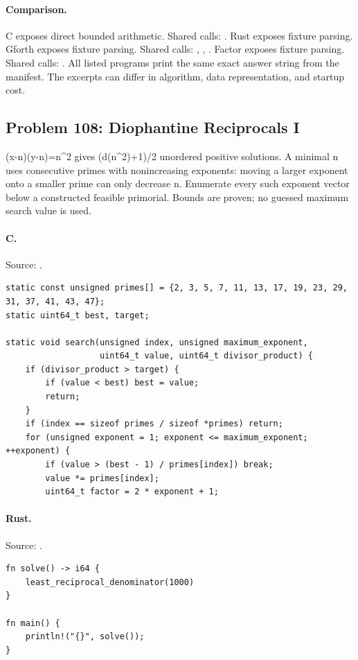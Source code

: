 \paragraph{Comparison.}
C exposes direct bounded arithmetic. Shared calls: \texttt{}. Rust exposes fixture parsing. Gforth exposes fixture parsing. Shared calls: \texttt{}, \texttt{}, \texttt{}. Factor exposes fixture parsing. Shared calls: \texttt{}.
All listed programs print the same exact answer string from the manifest. The excerpts can differ in algorithm, data representation, and startup cost.

\subsection{Problem 108: Diophantine Reciprocals I}
\label{walkthrough:p108}
(x-n)(y-n)=n\textasciicircum{}2 gives (d(n\textasciicircum{}2)+1)/2 unordered positive solutions. A minimal n uses consecutive primes with nonincreasing exponents: moving a larger exponent onto a smaller prime can only decrease n. Enumerate every such exponent vector below a constructed feasible primorial. Bounds are proven; no guessed maximum search value is used.

\paragraph{C.} Source: .
\begin{lstlisting}
static const unsigned primes[] = {2, 3, 5, 7, 11, 13, 17, 19, 23, 29, 31, 37, 41, 43, 47};
static uint64_t best, target;

static void search(unsigned index, unsigned maximum_exponent,
                   uint64_t value, uint64_t divisor_product) {
    if (divisor_product > target) {
        if (value < best) best = value;
        return;
    }
    if (index == sizeof primes / sizeof *primes) return;
    for (unsigned exponent = 1; exponent <= maximum_exponent; ++exponent) {
        if (value > (best - 1) / primes[index]) break;
        value *= primes[index];
        uint64_t factor = 2 * exponent + 1;
\end{lstlisting}

\paragraph{Rust.} Source: .
\begin{lstlisting}
fn solve() -> i64 {
    least_reciprocal_denominator(1000)
}

fn main() {
    println!("{}", solve());
}
\end{lstlisting}

